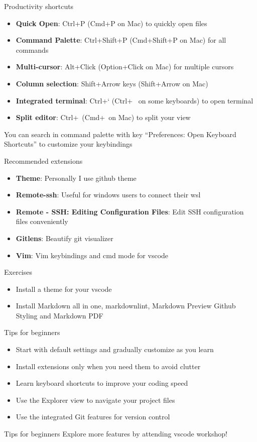 \begin{frame}[fragile]{Productivity shortcuts}
	\begin{itemize}
		\item \textbf{Quick Open}: Ctrl+P (Cmd+P on Mac) to quickly open files
		\item \textbf{Command Palette}: Ctrl+Shift+P (Cmd+Shift+P on Mac) for all commands
		\item \textbf{Multi-cursor}: Alt+Click (Option+Click on Mac) for multiple cursors
		\item \textbf{Column selection}: Shift+Arrow keys (Shift+Arrow on Mac)
		\item \textbf{Integrated terminal}: Ctrl+` (Ctrl+~ on some keyboards) to open terminal
		\item \textbf{Split editor}: Ctrl+\ (Cmd+\ on Mac) to split your view
	\end{itemize}

	You can search in command palette with key ``Preferences: Open Keyboard Shortcuts'' to customize your keybindings
\end{frame}

\begin{frame}[fragile]{Recommended extensions}
	\begin{itemize}
		\item \textbf{Theme}: Personally I use github theme
		\item \textbf{Remote-ssh}: Useful for windows users to connect their wsl
		\item \textbf{Remote - SSH: Editing Configuration Files}: Edit SSH configuration files conveniently
		\item \textbf{Gitlens}: Beautify git visualizer
		\item \textbf{Vim}: Vim keybindings and cmd mode for vscode
	\end{itemize}
\end{frame}

\begin{frame}[fragile]{Exercises}
	\begin{itemize}
		\item Install a theme for your vscode
		\item Install Markdown all in one, markdownlint, Markdown Preview Github Styling and Markdown PDF
	\end{itemize}
\end{frame}

\begin{frame}[fragile]{Tips for beginners}
	\begin{itemize}
		\item Start with default settings and gradually customize as you learn
		\item Install extensions only when you need them to avoid clutter
		\item Learn keyboard shortcuts to improve your coding speed
		\item Use the Explorer view to navigate your project files
		\item Use the integrated Git features for version control
	\end{itemize}
\end{frame}

\begin{frame}[fragile]{Tips for beginners}
	\huge Explore more features by attending vscode workshop!
\end{frame}
